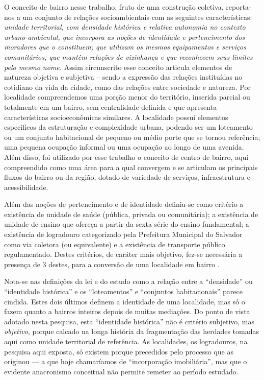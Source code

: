 \begin{citacao}
O conceito de bairro nesse trabalho, fruto de uma construção coletiva, reporta-nos a um conjunto de relações socioambientais com as seguintes características: \textit{unidade territorial, com densidade histórica e relativa autonomia no contexto urbano-ambiental, que incorpora as noções de identidade e pertencimento dos moradores que o constituem; que utilizam os mesmos equipamentos e serviços comunitários; que mantêm relações de vizinhança e que reconhecem seus limites pelo mesmo nome.} Assim circunscrito esse conceito articula elementos de natureza objetiva e subjetiva – sendo a expressão das relações instituídas no cotidiano da vida da cidade, como das relações entre sociedade e natureza. Por localidade compreendemos uma porção menor do território, inserida parcial ou totalmente em um bairro, sem centralidade definida e que apresenta características socioeconômicas similares. A localidade possui elementos específicos da estruturação e complexidade urbana, podendo ser um loteamento ou um conjunto habitacional de pequeno ou médio porte que se tornou referência; uma pequena ocupação informal ou uma ocupação ao longo de uma avenida. Além disso, foi utilizado por esse trabalho o conceito de centro de bairro, aqui compreendido como uma área para a qual convergem e se articulam os principais fluxos do bairro ou da região, dotado de variedade de serviços, infraestrutura e acessibilidade.

Além das noções de pertencimento e de identidade definiu-se como critério a existência de unidade de saúde (pública, privada ou comunitária); a existência de unidade de ensino que ofereça a partir da sexta série do ensino fundamental; a existência de logradouro categorizado pela Prefeitura Municipal do Salvador como via coletora (ou equivalente) e a existência de transporte público regulamentado. Destes critérios, de caráter mais objetivo, fez-se necessária a presença de 3 destes, para a conversão de uma localidade em bairro \cite[pp.~3-4]{santos_aguas_2010}.
\end{citacao}

Nota-se nas definições da lei e do estudo como a relação entre a ``densidade'' ou ``identidade histórica'' e os ``loteamentos'' e ``conjuntos habitacionais'' parece cindida. Estes dois últimos definem a identidade de uma localidade, mas só o fazem quanto a bairros inteiros depois de muitas mediações. Do ponto de vista adotado nesta pesquisa, esta ``identidade histórica'' não é critério subjetivo, mas \textit{objetivo}, porque calcado na longa história da fragmentação das herdades tomadas aqui como unidade territorial de referência. As localidades, os logradouros, na pesquisa aqui exposta, só existem porque precedidos pelo processo que as originou --- a que hoje chamaríamos de ``incorporação imobiliária'', mas que o evidente anacronismo conceitual não permite remeter ao período estudado.

